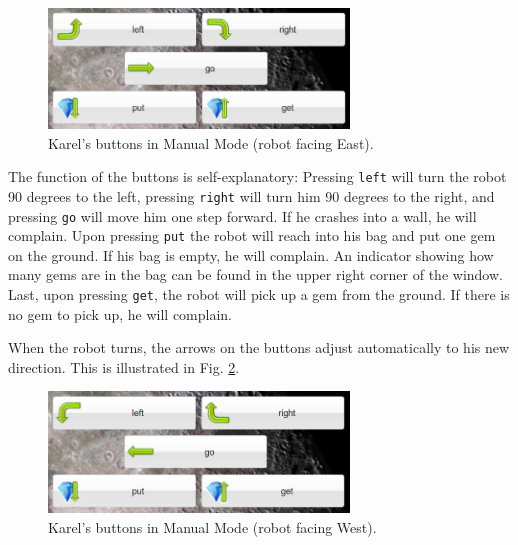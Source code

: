 \begin{figure}[!ht]
\begin{center}
\includegraphics[width=8cm]{img/buttons-all.png}
\vspace{-0mm}
\caption{Karel's buttons in Manual Mode (robot facing East).}
\label{fig:buttons}
\end{center}
\end{figure}
\noindent
The function of the buttons is self-explanatory: Pressing {\tt left} will turn the robot 90 degrees to the left,
pressing {\tt right} will turn him 90 degrees to the right, and pressing {\tt go} will move him one step forward.
If he crashes into a wall, he will complain. Upon pressing {\tt put} the robot will reach into his bag and 
put one gem on the ground. If his bag is empty, he will complain. An indicator showing how many gems are in 
the bag can be found in the upper right corner of the window. Last, upon pressing {\tt get}, the robot will 
pick up a gem from the ground. If there is no gem to pick up, he will complain.

When the robot turns, the arrows on the buttons adjust automatically to his new 
direction. This is illustrated in Fig. \ref{fig:buttons2}.

\begin{figure}[!ht]
\begin{center}
\includegraphics[width=8cm]{img/buttons-all-2.png}
\vspace{-0mm}
\caption{Karel's buttons in Manual Mode (robot facing West).}
\label{fig:buttons2}
\end{center}
\end{figure}


